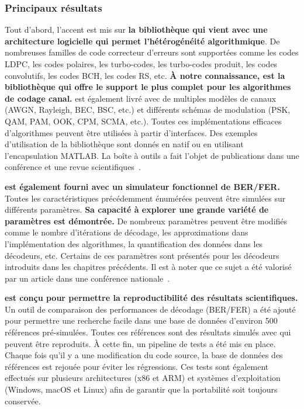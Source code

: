 \subsubsection*{Principaux résultats}

Tout d'abord, l'accent est mis sur \textbf{la bibliothèque \AFFECT qui vient
avec une architecture logicielle qui permet l'hétérogénéité algorithmique}. De
nombreuses familles de code correcteur d'erreurs sont supportées comme les
codes LDPC, les codes polaires, les turbo-codes, les turbo-codes produit, les
codes convolutifs, les codes BCH, les codes RS, etc. \textbf{À notre
connaissance, \AFFECT est la bibliothèque qui offre le support le plus complet
pour les algorithmes de codage canal.} \AFFECT est également livré avec de
multiples modèles de canaux  (AWGN, Rayleigh, BEC, BSC, etc.) et différents
schémas de modulation (PSK, QAM, PAM, OOK, CPM, SCMA, etc.). Toutes ces
implémentations efficaces d'algorithmes peuvent être utilisées à partir
d'interfaces. Des exemples d'utilisation de la bibliothèque sont donnés en \Cxx
natif ou en utilisant l'encapsulation MATLAB\R. La boîte à outils \AFFECT a fait
l'objet de publications dans une conférence et une revue
scientifiques~\cite{Cassagne2017a,Cassagne2019a}.

\textbf{\AFFECT est également fourni avec un simulateur fonctionnel de BER/FER.}
Toutes les caractéristiques précédemment énumérées peuvent être simulées sur
différents paramètres. \textbf{Sa capacité à explorer une grande variété de
paramètres est démontrée.} De nombreux paramètres peuvent être modifiés comme le
nombre d'itérations de décodage, les approximations dans l'implémentation des
algorithmes, la quantification des données dans les décodeurs, etc. Certains de
ces paramètres sont présentés pour les décodeurs introduits dans les chapitres
précédents. Il est à noter que ce sujet a été valorisé par un article dans une
conférence nationale~\cite{Cassagne2017}.

\textbf{\AFFECT est conçu pour permettre la reproductibilité des résultats
scientifiques.} Un outil de comparaison des performances de décodage (BER/FER) a
été ajouté pour permettre une recherche facile dans une base de données
d'environ 500 références pré-simulées. Toutes ces références sont des résultats
simulés avec \AFFECT qui peuvent être reproduits. À cette fin, un pipeline de
tests a été mis en place. Chaque fois qu'il y a une modification du code source,
la base de données des références est rejouée pour éviter les régressions. Ces
tests sont également effectués sur plusieurs architectures (x86 et ARM\R) et
systèmes d'exploitation (Windows, macOS et Linux) afin de garantir que la
portabilité soit toujours conservée.

